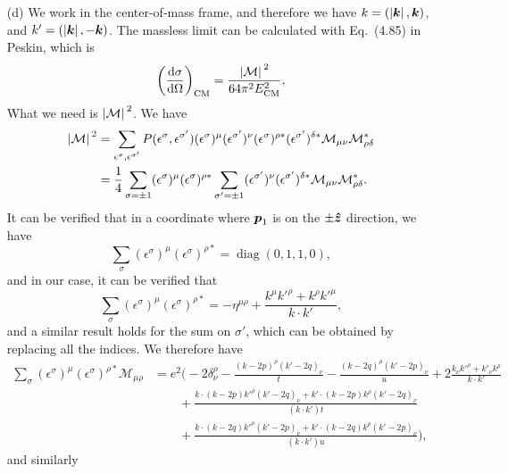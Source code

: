 \documentclass[hyperref, a4paper]{article}
\DeclareMathOperator{\diag}{diag}
\begin{document}
\begin{itemize}
\item[(d)] We work in the center-of-mass frame, and therefore we have $k = (\abs*{\vb*{k}}, \vb*{k})$, 
and $k' = (\abs*{\vb*{k}}, - \vb*{k})$. 
The massless limit can be calculated with Eq.~(4.85) in Peskin, which is 
\begin{equation}
    \left(\dv{\sigma}{\Omega}\right)_\text{CM} = \frac{\abs*{\mathcal{M}}^2}{64 \pi^2 E_\text{CM}^2},
\end{equation} 
What we need is $\abs*{\mathcal{M}}^2$. We have 
\[
    \begin{aligned}
        \abs*{\mathcal{M}}^2 &= \sum_{\epsilon^\sigma, \epsilon^{\sigma'}} P(\epsilon^\sigma, \epsilon^{\sigma'})
        (\epsilon^\sigma)^\mu (\epsilon^{\sigma'})^\nu (\epsilon^\sigma)^{\rho *} (\epsilon^{\sigma'})^{\delta *} 
        \mathcal{M}_{\mu \nu} \mathcal{M}_{\rho \delta}^* \\
        &= \frac{1}{4} \sum_{\sigma= \pm 1}  (\epsilon^\sigma)^\mu (\epsilon^\sigma)^{\rho *}
        \sum_{\sigma' = \pm 1} (\epsilon^{\sigma'})^\nu (\epsilon^{\sigma'})^{\delta *}
        \mathcal{M}_{\mu \nu} \mathcal{M}_{\rho \delta}^* .
    \end{aligned}
\]
It can be verified that in a coordinate where $\vb*{p}_1$ is on the $\pm \vu*{z}$ direction, we have 
\[
    \sum_\sigma (\epsilon^\sigma)^\mu (\epsilon^\sigma)^{\rho *} = \diag(0, 1, 1, 0),
\] 
and in our case, it can be verified that 
\begin{equation}
    \sum_\sigma (\epsilon^\sigma)^\mu (\epsilon^\sigma)^{\rho *} = - \eta^{\mu \rho} + 
    \frac{k^\mu k'^\rho + k^\rho k'^\mu }{k \cdot k'},
\end{equation}
and a similar result holds for the sum on $\sigma'$, which can be obtained by replacing all the indices. 
We therefore have 
\[
    \begin{aligned}
        \sum_\sigma (\epsilon^\sigma)^\mu (\epsilon^\sigma)^{\rho *} \mathcal{M}_{\mu \rho} &= e^2
        \Big( - 2 \delta^\rho_\nu - \frac{(k-2p)^\rho (k'-2q)_\nu}{t} - \frac{(k-2q)^\rho (k'-2p)_\nu}{u} 
        + 2 \frac{k_\nu k'^\rho + k'_\nu k^\rho}{k \cdot k'} \\
        &\quad \quad + \frac{k \cdot (k-2p) k'^\rho (k'-2q)_\nu + k' \cdot (k - 2p) k^\rho (k'-2q)_\nu}{(k \cdot k') t} \\
        &\quad \quad + \frac{k \cdot (k-2q) k'^\rho (k'-2p)_\nu + k' \cdot (k - 2q) k^\rho (k'-2p)_\nu}{(k \cdot k') u} \Big),
    \end{aligned}
\]
and similarly 
\[
    \begin{aligned}

\end{aligned}\]
\end{itemize}
\end{document}
